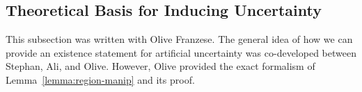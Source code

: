 %            	
%            	
%
%




\subsection{Theoretical Basis for Inducing Uncertainty} 

\begin{contriback}
This subsection was written with Olive Franzese. The general idea of how we can provide an existence statement for artificial uncertainty was co-developed between Stephan, Ali, and Olive. However, Olive provided the exact formalism of Lemma~\ref{lemma:region-manip} and its proof.
\end{contriback}

